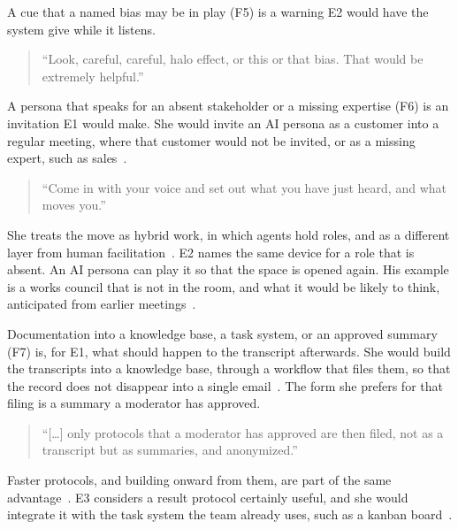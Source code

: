A cue that a named bias may be in play (F5) is a warning E2 would have the system give while
it listens.
{\setlength{\topsep}{0.25\baselineskip}\setlength{\partopsep}{0pt}%
  \begin{quote}\small
    \enquote{Look, careful, careful, halo effect, or this or that bias. That would be extremely
    helpful.}~
\end{quote}}

A persona that speaks for an absent stakeholder or a missing expertise (F6) is an invitation
E1 would make.
She would invite an AI persona as a customer into a regular meeting, where that customer
would not be invited, or as a missing expert, such as sales~.
{\setlength{\topsep}{0.25\baselineskip}\setlength{\partopsep}{0pt}%
  \begin{quote}\small
    \enquote{Come in with your voice and set out what you have just heard, and what moves
    you.}~
\end{quote}}
She treats the move as hybrid work, in which agents hold roles, and as a different layer from
human facilitation~.
E2 names the same device for a role that is absent.
An AI persona can play it so that the space is opened again.
His example is a works council that is not in the room, and what it would be likely to think,
anticipated from earlier meetings~.

Documentation into a knowledge base, a task system, or an approved summary (F7) is, for E1,
what should happen to the transcript afterwards.
She would build the transcripts into a knowledge base, through a workflow that files them,
so that the record does not disappear into a single email~.
The form she prefers for that filing is a summary a moderator has approved.
{\setlength{\topsep}{0.25\baselineskip}\setlength{\partopsep}{0pt}%
  \begin{quote}\small
    \enquote{[\ldots] only protocols that a moderator has approved are then filed, not as a
    transcript but as summaries, and anonymized.}~
\end{quote}}
Faster protocols, and building onward from them, are part of the same advantage~.
E3 considers a result protocol certainly useful, and she would integrate it with the task
system the team already uses, such as a kanban board~.

